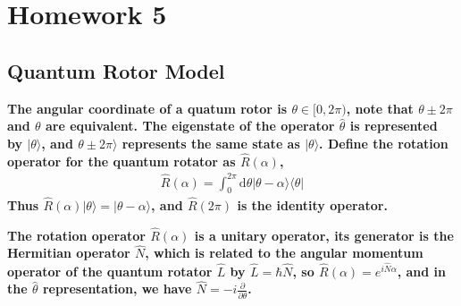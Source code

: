 \documentclass[../../main.tex]{subfiles}
\begin{document}
\section{Homework 5}
\subsection{Quantum Rotor Model}
\textbf{The angular coordinate of a quatum rotor is $\theta\in [0,2\pi)$, note that $\theta \pm 2\pi$ and $\theta$ are equivalent. The eigenstate of the operator $\hat{\theta}$ is represented by $|\theta\rangle$, and $\theta\pm 2\pi\rangle$ represents the same state as $|\theta\rangle$. Define the rotation operator for the quantum rotator as $\hat{R}(\alpha)$,
\begin{align*}
  \hat{R}(\alpha) = \int_{0}^{2\pi}\mathrm{d}\theta|\theta - \alpha\rangle\langle\theta|
\end{align*}
Thus $\hat{R}(\alpha)|\theta\rangle = |\theta-\alpha\rangle$, and $\hat{R}(2\pi)$ is the identity operator.}

\textbf{The rotation operator $\hat{R}(\alpha)$ is a unitary operator, its generator is the Hermitian operator $\hat{N}$, which is related to the angular momentum operator of the quantum rotator $\hat{L}$ by $\hat{L} = \hbar\hat{N}$, so $\hat{R}(\alpha) = e^{i\hat{N}\alpha}$, and in the $\hat{\theta}$ representation, we have $\hat{N} = -i\frac{\partial}{\partial\theta}$.}
\end{document}
